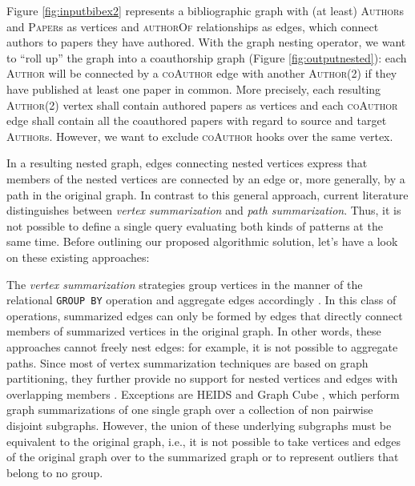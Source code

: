 \begin{ex}[label=ex1]
Figure \ref{fig:inputbibex2} represents a bibliographic graph with (at least) \textsc{Author}s and \textsc{Paper}s as vertices and \textsc{authorOf} relationships as edges, which connect authors to papers they have authored. With the graph nesting operator, we want to ``roll up'' the graph into a coauthorship graph (Figure \ref{fig:outputnested}):  each \textsc{Author} will be connected by a \textsc{coAuthor} edge with another \textsc{Author}(2) if they have published at least one paper in common.
More precisely, each resulting \textsc{Author}(2) vertex shall contain authored papers as vertices and each \textsc{coAuthor} edge shall contain all the coauthored papers with regard to source and target \textsc{Author}s. However, we want to exclude \textsc{coAuthor} hooks over the same vertex.
\end{ex}

In a resulting nested graph, edges connecting nested vertices express that members of the nested vertices are connected by an edge or, more generally, by a path in the original graph.
In contrast to this general approach, current literature distinguishes between \textit{vertex summarization} and \textit{path summarization}. Thus, it is not possible to define a single query evaluating both kinds of patterns at the same time. Before outlining our proposed algorithmic solution, let's have a look on these existing approaches:

The \textit{vertex summarization} strategies group vertices in the manner of the relational \texttt{GROUP BY} operation and aggregate edges accordingly \cite{JunghannsPR17}. In this class of operations, summarized edges can only be formed by edges that directly connect members of summarized vertices in the original graph. In other words, these approaches cannot freely nest edges: for example, it is not possible to aggregate paths. Since most of vertex summarization techniques are based on graph partitioning, they further provide no support for nested vertices and edges with overlapping members \cite{yin,Tian20085,jakawat}.
Exceptions are HEIDS \cite{ChengJQ16} and Graph Cube \cite{Zhao11}, which perform graph summarizations of one single graph over a collection of non pairwise disjoint subgraphs. However, the union of these underlying subgraphs must be equivalent to the original graph, i.e., it is not possible to take vertices and edges of the original graph over to the summarized graph or to represent outliers that belong to no group.

